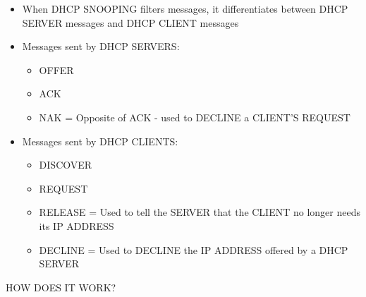 \begin{itemize}
\item
  When DHCP SNOOPING filters messages, it differentiates between DHCP
  SERVER messages and DHCP CLIENT messages
\item
  Messages sent by DHCP SERVERS:

  \begin{itemize}
  \tightlist
  \item
    OFFER
  \item
    ACK
  \item
    NAK = Opposite of ACK - used to DECLINE a CLIENT'S REQUEST
  \end{itemize}
\item
  Messages sent by DHCP CLIENTS:

  \begin{itemize}
  \tightlist
  \item
    DISCOVER
  \item
    REQUEST
  \item
    RELEASE = Used to tell the SERVER that the CLIENT no longer needs
    its IP ADDRESS
  \item
    DECLINE = Used to DECLINE the IP ADDRESS offered by a DHCP SERVER
  \end{itemize}
\end{itemize}

HOW DOES IT WORK?

